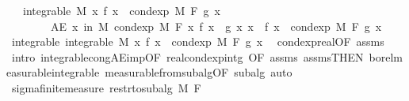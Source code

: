 \begin{isabellebody}
\ \ \ {\isachardoublequoteopen}integrable\ M\ {\isacharparenleft}{\kern0pt}{\isasymlambda}x{\isachardot}{\kern0pt}\ f\ x\ {\isacharasterisk}{\kern0pt}\ cond{\isacharunderscore}{\kern0pt}exp\ M\ F\ g\ x{\isacharparenright}{\kern0pt}{\isachardoublequoteclose}\isanewline
\ \ \ \ \ \ \ \ {\isachardoublequoteopen}AE\ x\ in\ M{\isachardot}{\kern0pt}\ cond{\isacharunderscore}{\kern0pt}exp\ M\ F\ {\isacharparenleft}{\kern0pt}{\isasymlambda}x{\isachardot}{\kern0pt}\ f\ x\ {\isacharasterisk}{\kern0pt}\ g\ x{\isacharparenright}{\kern0pt}\ x\ {\isacharequal}{\kern0pt}\ f\ x\ {\isacharasterisk}{\kern0pt}\ cond{\isacharunderscore}{\kern0pt}exp\ M\ F\ g\ x{\isachardoublequoteclose}\isanewline
%
\isadelimproof
%
\endisadelimproof
%
\isatagproof
{}\isamarkupfalse%
{\isacharminus}{\kern0pt}\isanewline
\ \ \isamarkupfalse%
\ integrable{\isacharcolon}{\kern0pt}\ {\isachardoublequoteopen}integrable\ M\ {\isacharparenleft}{\kern0pt}{\isasymlambda}x{\isachardot}{\kern0pt}\ f\ x\ {\isacharasterisk}{\kern0pt}\ cond{\isacharunderscore}{\kern0pt}exp\ M\ F\ g\ x{\isacharparenright}{\kern0pt}{\isachardoublequoteclose}\ \isamarkupfalse%
\ cond{\isacharunderscore}{\kern0pt}exp{\isacharunderscore}{\kern0pt}real{\isacharbrackleft}{\kern0pt}OF\ assms{\isacharparenleft}{\kern0pt}{}{\isacharparenright}{\kern0pt}{\isacharbrackright}{\kern0pt}\ \isamarkupfalse%
\ {\isacharparenleft}{\kern0pt}intro\ integrable{\isacharunderscore}{\kern0pt}cong{\isacharunderscore}{\kern0pt}AE{\isacharunderscore}{\kern0pt}imp{\isacharbrackleft}{\kern0pt}OF\ real{\isacharunderscore}{\kern0pt}cond{\isacharunderscore}{\kern0pt}exp{\isacharunderscore}{\kern0pt}intg{\isacharparenleft}{\kern0pt}{}{\isacharparenright}{\kern0pt}{\isacharcomma}{\kern0pt}\ OF\ assms{\isacharparenleft}{\kern0pt}{}{\isacharcomma}{\kern0pt}{}{\isacharparenright}{\kern0pt}\ assms{\isacharparenleft}{\kern0pt}{}{\isacharparenright}{\kern0pt}{\isacharbrackleft}{\kern0pt}THEN\ borel{\isacharunderscore}{\kern0pt}measurable{\isacharunderscore}{\kern0pt}integrable{\isacharbrackright}{\kern0pt}{\isacharbrackright}{\kern0pt}\ measurable{\isacharunderscore}{\kern0pt}from{\isacharunderscore}{\kern0pt}subalg{\isacharbrackleft}{\kern0pt}OF\ subalg{\isacharbrackright}{\kern0pt}{\isacharparenright}{\kern0pt}\ auto\isanewline
\ \ \isamarkupfalse%
\ sigma{\isacharunderscore}{\kern0pt}finite{\isacharunderscore}{\kern0pt}measure\ {\isachardoublequoteopen}restr{\isacharunderscore}{\kern0pt}to{\isacharunderscore}{\kern0pt}subalg\ M\ F{\isachardoublequoteclose}\ \isamarkupfalse%

\end{isabellebody}
